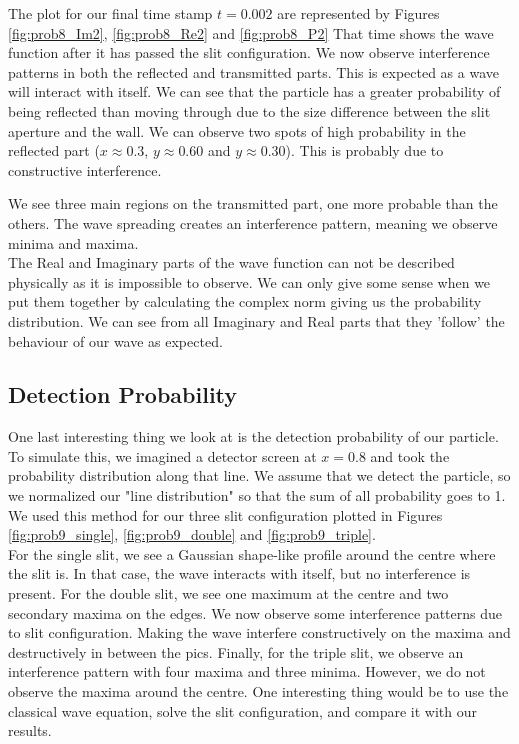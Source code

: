 \documentclass[english,notitlepage,reprint,nofootinbib]{revtex4-2}  %
\begin{document}
	The plot for our final time stamp $t=0.002$ are represented by
	Figures \ref{fig:prob8_Im2}, \ref{fig:prob8_Re2} and \ref{fig:prob8_P2}
	That time shows the wave function after it has passed the slit configuration.
	We now observe interference patterns in both the reflected and transmitted parts. This is expected as a wave will interact with itself. We can see that the particle has a greater probability of being reflected than moving through due to the size difference
	between the slit aperture and the wall. We can observe two spots of high probability in
	the reflected part ($x\approx0.3$, $y\approx0.60$ and $y\approx0.30$). This is
	probably due to constructive interference.

	We see three main regions on the transmitted part, one more probable than the others. The wave spreading creates an interference pattern, meaning we observe minima and maxima. \\

	The Real and Imaginary parts of the wave function can not be described physically as it is impossible to observe. We can only give some sense when we put them
	together by calculating the complex norm giving us the probability distribution. We can
	see from all Imaginary and Real parts that they 'follow' the behaviour of our wave as
	expected.

	\subsection{Detection Probability} \label{subsec:detec_prob}

	One last interesting thing we look at is the detection probability of our particle.
	To simulate this, we imagined a detector screen at $x=0.8$ and took the probability
	distribution along that line. We assume that we detect the particle, so we normalized our "line distribution" so that the sum of all probability goes to 1. We used this method
	for our three slit configuration plotted in Figures \ref{fig:prob9_single}, \ref{fig:prob9_double}
	and \ref{fig:prob9_triple}. \\

	For the single slit, we see a Gaussian shape-like profile around the centre where the slit
	is. In that case, the wave interacts with itself, but no interference is present.	For the
	double slit, we see one maximum at the centre and two secondary maxima on the edges. We now observe some interference patterns due to slit configuration. Making the wave interfere constructively on the maxima and destructively in between the pics. Finally, for
	the triple slit, we observe an interference pattern with four maxima and three
	minima. However, we do not observe the maxima around the centre. One interesting thing would be to use the classical wave equation, solve the slit configuration, and compare it with our results.
	
\end{document}
